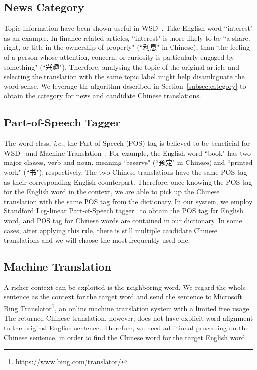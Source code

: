 \begin{CJK}{UTF8}{gbsn}
\subsection{News Category}
Topic information have been shown useful in WSD~\cite{Boyd-Graber2007}. Take English word  ``interest" as an example. In finance related articles, ``interest" is more likely to be ``a share, right, or title in the ownership of property" (``利息" in Chinese), than `the feeling of a person whose attention, concern, or curiosity is particularly engaged by something" (``兴趣").  Therefore, analysing the topic of the original article and selecting the translation with the same topic label might help disambiguate the word sense. We leverage the algorithm described in Section~\ref{subsec:category} to obtain the category for news and candidate Chinese translations. 


\subsection{Part-of-Speech Tagger}
The word class, {\it i.e.}, the Part-of-Speech (POS) tag is believed to be beneficial for WSD~\cite{Wilks1998} and Machine Translation~\cite{Toutanova2002,Ueffing2003}.
For example, the English word ``book" has two major classes, verb and noun, meaning ``reserve" (``预定" in Chinese) and ``printed work" (``书"), respectively. The two  Chinese translations have the same POS tag as their corresponding English counterpart.
Therefore, once knowing the POS tag for the English word in the context, we are able to pick up the Chinese translation with the same POS tag from the dictionary.
In our system, we employ Standford Log-linear Part-of-Speech tagger~\cite{Toutanova2003} to obtain the POS tag for English word, and POS tag for Chinese words are contained in our dictionary.
 In some cases, after applying this rule, there is still multiple candidate Chinese translations and we will choose the most frequently used one. 


\subsection{Machine Translation}
A richer context can be exploited is the neighboring word. We regard the whole sentence as the context for the target word and send the sentence to Microsoft Bing Translator\footnote{\url{https://www.bing.com/translator/}}, an online machine translation system with a limited free usage. The returned Chinese translation, however, does not have explicit word alignment to the original English sentence. Therefore, we need additional processing on the Chinese sentence, in order to find the Chinese word for the target English word.



\end{CJK}
